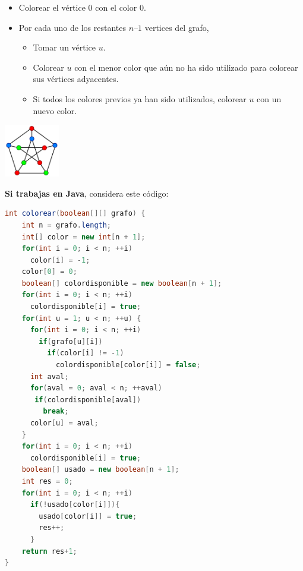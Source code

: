 \documentclass[10 pt]{article}
\begin{document}
  \begin{multicols}{2}

  \begin{itemize}[noitemsep]
    \item Colorear el vértice $0$ con el color $0$.
    \item Por cada uno de los restantes $n – 1$ vertices del grafo, 
    \begin{itemize}
     \item Tomar un vértice $u$. 
     \item Colorear $u$ con el menor color que aún no ha sido utilizado para colorear sus vértices adyacentes. 
     \item Si todos los colores previos ya han sido utilizados, colorear $u$ con un nuevo color.
    \end{itemize}
  \end{itemize}

  \includegraphics[width=0.18\textwidth]{coloring.png}

\end{multicols}

\textbf{Si trabajas en Java}, considera este código:

  \begin{lstlisting}[language = java]
int colorear(boolean[][] grafo) {
    int n = grafo.length;
    int[] color = new int[n + 1];
    for(int i = 0; i < n; ++i) 
      color[i] = -1;
    color[0] = 0;
    boolean[] colordisponible = new boolean[n + 1];
    for(int i = 0; i < n; ++i) 
      colordisponible[i] = true;
    for(int u = 1; u < n; ++u) {
      for(int i = 0; i < n; ++i)
        if(grafo[u][i])
          if(color[i] != -1)
            colordisponible[color[i]] = false;
      int aval;
      for(aval = 0; aval < n; ++aval)
       if(colordisponible[aval])
         break;
      color[u] = aval; 
    }
    for(int i = 0; i < n; ++i) 
      colordisponible[i] = true;
    boolean[] usado = new boolean[n + 1];
    int res = 0;
    for(int i = 0; i < n; ++i) 
      if(!usado[color[i]]){
        usado[color[i]] = true; 
        res++;
      }
    return res+1;
}
  \end{lstlisting}
\end{document}
